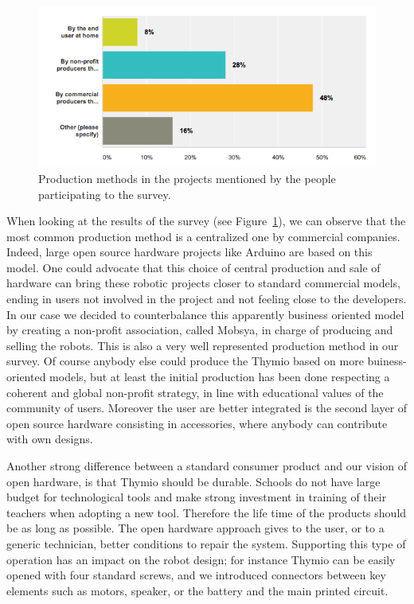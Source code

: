 \documentclass[letterpaper, 10 pt, conference]{ieeeconf}  %
\begin{document}
\begin{figure}
\centering
\includegraphics[width=\columnwidth]{figures/production}
\caption{Production methods in the projects mentioned by the people participating to the survey.}
\label{fig:production}
\end{figure}

When looking at the results of the survey (see Figure~\ref{fig:production}), we can observe that the most common production method is a centralized one by commercial companies.
Indeed, large open source hardware projects like Arduino are based on this model.
One could advocate that this choice of central production and sale of hardware can bring these robotic projects closer to standard commercial models, ending in users not involved in the project and not feeling close to the developers.
In our case we decided to counterbalance this apparently business oriented model by creating a non-profit association, called Mobsya, in charge of producing and selling the robots. 
This is also a very well represented production method in our survey.
Of course anybody else could produce the Thymio based on more buiness-oriented models, but at least the initial production has been done respecting a coherent and global non-profit strategy, in line with educational values of the community of users.
Moreover the user are better integrated is the second layer of open source hardware consisting in accessories, where anybody can contribute with own designs.

Another strong difference between a standard consumer product and our vision of open hardware, is that Thymio should be durable.
Schools do not have large budget for technological tools and make strong investment in training of their teachers when adopting a new tool.
Therefore the life time of the products should be as long as possible. 
The open hardware approach gives to the user, or to a generic technician, better conditions to repair the system.
Supporting this type of operation has an impact on the robot design; for instance Thymio can be easily opened with four standard screws, and we introduced connectors between key elements such as motors, speaker, or the battery and the main printed circuit. 
\end{document}
